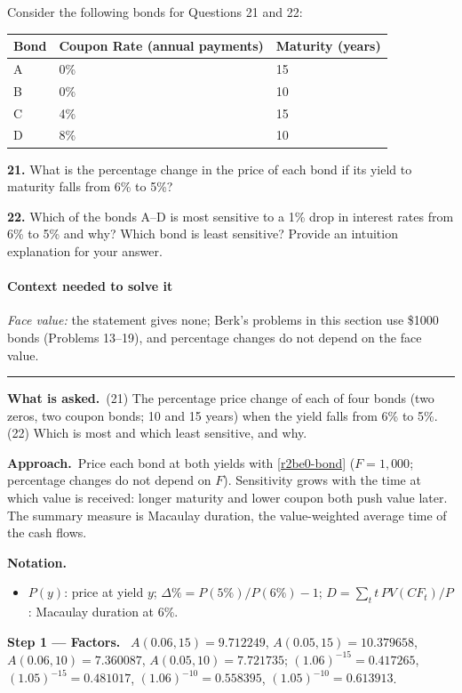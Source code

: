 \documentclass[11pt,a4paper]{article}
\newcommand{\notation}{\par\noindent\textbf{Notation.}}
\newcommand{\step}[2]{\par\medskip\noindent\textbf{Step #1 --- #2.}~}
\newcommand{\asked}{\par\medskip\noindent\textbf{What is asked.}~}
\newcommand{\approach}{\par\smallskip\noindent\textbf{Approach.}~}
\newcommand{\stmtend}{\par\endgroup\nopagebreak\noindent\rule{\linewidth}{0.4pt}\par\medskip}
\begin{document}
Consider the following bonds for Questions 21 and 22:

{\def\LTcaptype{none} %
\begin{longtable}[]{@{}lll@{}}
\toprule\noalign{}
Bond & Coupon Rate (annual payments) & Maturity (years) \\
\midrule\noalign{}
\endhead
\bottomrule\noalign{}
\endlastfoot
A & 0\% & 15 \\
B & 0\% & 10 \\
C & 4\% & 15 \\
D & 8\% & 10 \\
\end{longtable}
}

\textbf{21.} What is the percentage change in the price of each bond if its yield to maturity falls
from 6\% to 5\%?

\textbf{22.} Which of the bonds A--D is most sensitive to a 1\% drop in interest rates from 6\% to
5\% and why? Which bond is least sensitive? Provide an intuition explanation for your answer.

\paragraph{Context needed to solve it}

\emph{Face value:} the statement gives none; Berk's problems in this section use \$1000 bonds
(Problems 13--19), and percentage changes do not depend on the face value.
\stmtend

\asked (21) The percentage price change of each of four bonds (two zeros, two coupon bonds; 10 and 15 years) when the yield
falls from 6\% to 5\%. (22) Which is most and which least sensitive, and why.

\approach Price each bond at both yields with \eqref{r2be0-bond} ($F=1{,}000$; percentage changes do not depend on $F$).
Sensitivity grows with the time at which value is received: longer maturity and lower coupon both push value later. The
summary measure is Macaulay duration, the value-weighted average time of the cash flows.

\notation
\begin{itemize}
  \item $P(y)$: price at yield $y$; $\Delta\% = P(5\%)/P(6\%)-1$; $D=\sum_t t\,PV(CF_t)/P$: Macaulay duration at 6\%.
\end{itemize}

\step{1}{Factors} $A(0.06,15)=9.712249$, $A(0.05,15)=10.379658$, $A(0.06,10)=7.360087$, $A(0.05,10)=7.721735$;
$(1.06)^{-15}=0.417265$, $(1.05)^{-15}=0.481017$, $(1.06)^{-10}=0.558395$, $(1.05)^{-10}=0.613913$.
\end{document}
